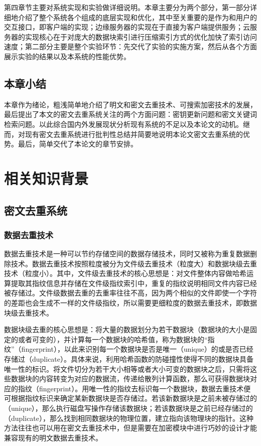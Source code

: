\documentclass[promaster]{thesis-uestc}
\begin{document}
第四章节主要对系统实现和实验做详细说明。本章主要分为两个部分，第一部分详细地介绍了整个系统各个组成的底层实现和优化，其中至关重要的是作为和用户的交互接口，即客户端的实现；边缘服务器的实现在于直接为客户端提供服务；云服务器的实现核心在于对庞大的数据块索引进行压缩索引方式的优化加快了索引访问速度；第二部分主要是整个实验环节：先交代了实验的实施方案，然后从各个方面展示实验的结果以及本系统的性能优势。

\section{本章小结}
本章作为绪论，粗浅简单地介绍了明文和密文去重技术、可搜索加密技术的发展，最后提出了本文的密文去重系统关注的两个方面问题：密钥更新问题和密文关键词检索问题。以此综合国内外发展现状分析现有系统的不足以及本论文的动机。继而，对现有密文去重系统进行批判性总结并简要地说明本论文密文去重系统的优势。最后，简单交代了本论文的章节安排。

\chapter{相关知识背景}

\section{密文去重系统}

\subsection{数据去重技术}\label{指纹}
数据去重技术是一种可以节约存储空间的数据存储技术，同时又被称为重复数据删除技术。数据去重技术按照粒度被分为文件级去重技术（粒度大）和数据块级去重技术（粒度小）。其中，文件级去重技术的核心思想是：对文件整体内容做哈希运算提取其指纹信息并存储在文件级指纹索引中，重复的指纹说明相同文件内容已经被存储过。文件级数据去重的去重率往往不高，因为两个相似的文件即使一个字符的差距也会生成不一样的文件级指纹，所以需要更细粒度的数据去重技术，即数据块级去重技术。

数据块级去重的核心思想是：将大量的数据划分为若干数据块（数据块的大小是固定的或者可变的），并计算每一个数据块的哈希值，称为数据块的“指纹”（fingerprint），以此来识别每一个数据块是否是唯一（unique）的或是否已经存储过（duplicate）。具体来说，利用哈希函数的防碰撞性使得不同的数据块具备唯一性的标识。将文件切分为若干大小相等或者大小可变的数据块之后，只需将这些数据块的内容转变为对应的数据流，传递给散列计算函数，那么可获得数据块对应的指纹（fingerprint）。用唯一性的指纹去标识每一个数据块，数据去重技术便可根据指纹标识来确定某新数据块是否存储过。若该新数据块是之前未被存储过的（unique），那么执行磁盘写操作存储该数据块；若该数据块是之前已经存储过的（duplicate），那么找到相同数据块的物理位置，建立指向该物理块的指针。这种方法往往也可以用在密文去重技术中，但是需要在加密模块中进行巧妙的设计才能兼容现有的明文数据去重技术。
\end{document}
